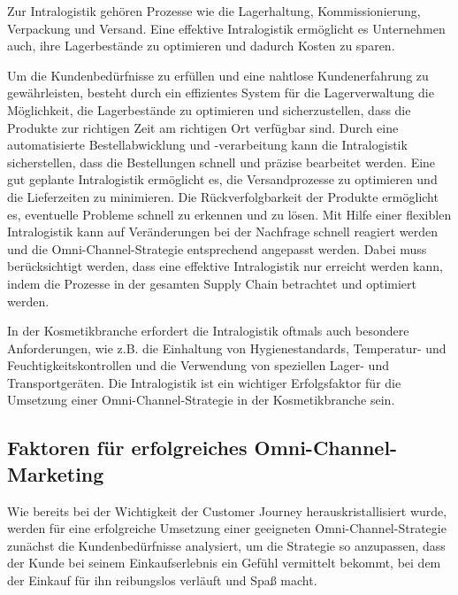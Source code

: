 Zur Intralogistik gehören Prozesse wie die Lagerhaltung, Kommissionierung, Verpackung und Versand. Eine effektive Intralogistik ermöglicht es Unternehmen auch, ihre Lagerbestände zu optimieren und dadurch Kosten zu sparen.
\newline

Um die Kundenbedürfnisse zu erfüllen und eine nahtlose Kundenerfahrung zu gewährleisten, besteht durch ein effizientes System für die Lagerverwaltung die Möglichkeit, die Lagerbestände zu optimieren und sicherzustellen, dass die Produkte zur richtigen Zeit am richtigen Ort verfügbar sind. Durch eine automatisierte Bestellabwicklung und -verarbeitung kann die Intralogistik sicherstellen, dass die Bestellungen schnell und präzise bearbeitet werden. Eine gut geplante Intralogistik ermöglicht es, die Versandprozesse zu optimieren und die Lieferzeiten zu minimieren. Die Rückverfolgbarkeit der Produkte ermöglicht es, eventuelle Probleme schnell zu erkennen und zu lösen. Mit Hilfe einer flexiblen Intralogistik kann auf Veränderungen bei der Nachfrage schnell reagiert werden und die Omni-Channel-Strategie entsprechend angepasst werden. Dabei muss berücksichtigt werden, dass eine effektive Intralogistik nur erreicht werden kann, indem die Prozesse in der gesamten Supply Chain betrachtet und optimiert werden.
\newline

In der Kosmetikbranche erfordert die Intralogistik oftmals auch besondere Anforderungen, wie z.B. die Einhaltung von Hygienestandards, Temperatur- und Feuchtigkeitskontrollen und die Verwendung von speziellen Lager- und Transportgeräten. Die Intralogistik ist ein wichtiger Erfolgsfaktor für die Umsetzung einer Omni-Channel-Strategie in der Kosmetikbranche sein.

\subsection{Faktoren für erfolgreiches Omni-Channel-Marketing}\label{unterabschnitt_3_7}
Wie bereits bei der Wichtigkeit der Customer Journey herauskristallisiert wurde, werden für eine erfolgreiche Umsetzung einer geeigneten Omni-Channel-Strategie zunächst die Kundenbedürfnisse analysiert, um die Strategie so anzupassen, dass der Kunde bei seinem Einkaufserlebnis ein Gefühl vermittelt bekommt, bei dem der Einkauf für ihn reibungslos verläuft und Spaß macht.
\newline

